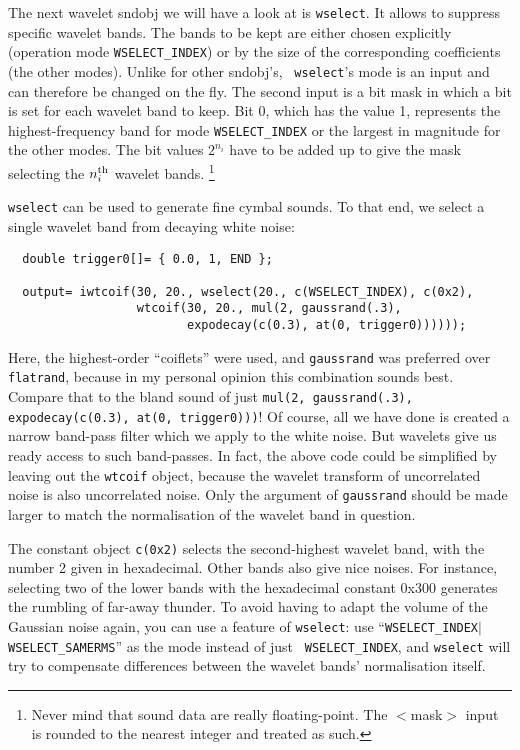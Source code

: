 \documentclass{article}
\def\bv{\begin{verbatim}}
\begin{document}
The next wavelet sndobj we will have a look at is {\tt wselect}.  It allows to
suppress specific wavelet bands.  The bands to be kept are either chosen
explicitly (operation mode {\tt WSELECT\_INDEX}) or by the size of the
corresponding coefficients (the other modes).  Unlike for other sndobj's, {\tt
wselect}'s mode is an input and can therefore be changed on the fly.  The
second input is a bit mask in which a bit is set for each wavelet band to keep.
Bit 0, which has the value 1, represents the highest-frequency band for mode
{\tt WSELECT\_INDEX} or the largest in magnitude for the other modes.  The 
bit values $2^{n_i}$ have to be added up to give the mask selecting the
$n_i^{\hbox{\scriptsize th}}$ wavelet bands.%
%
\footnote{Never mind that sound data are really floating-point.  The $<$mask$>$
input is rounded to the nearest integer and treated as such.}

{\tt wselect} can be used to generate fine cymbal sounds.  To that end, we
select a single wavelet band from decaying white noise:

\bv
  double trigger0[]= { 0.0, 1, END };

  output= iwtcoif(30, 20., wselect(20., c(WSELECT_INDEX), c(0x2),
                  wtcoif(30, 20., mul(2, gaussrand(.3),
                         expodecay(c(0.3), at(0, trigger0))))));
\end{verbatim}

Here, the highest-order ``coiflets'' were used, and {\tt gaussrand} was
preferred over {\tt flatrand}, because in my personal opinion this combination
sounds best.  Compare that to the bland sound of just {\tt mul(2,
gaussrand(.3), expodecay(c(0.3), at(0, trigger0)))}!  Of course, all we have
done is created a narrow band-pass filter which we apply to the white noise.
But wavelets give us ready access to such band-passes.  In fact, the above code
could be simplified by leaving out the {\tt wtcoif} object, because the wavelet
transform of uncorrelated noise is also uncorrelated noise.  Only the argument
of {\tt gaussrand} should be made larger to match the normalisation of the
wavelet band in question.

The constant object {\tt c(0x2)} selects the second-highest wavelet band, with
the number 2 given in hexadecimal.  Other bands also give nice noises.  For
instance, selecting two of the lower bands with the hexadecimal constant 0x300
generates the rumbling of far-away thunder.  To avoid having to adapt the
volume of the Gaussian noise again, you can use a feature of {\tt wselect}:
use ``{\tt WSELECT\_INDEX$|$WSELECT\_SAMERMS}'' as the mode instead of just {\tt
WSELECT\_INDEX}, and {\tt wselect} will try to compensate differences between
the wavelet bands' normalisation itself.
\end{document}
